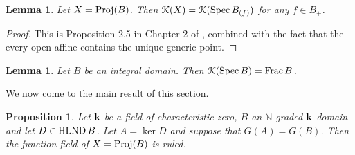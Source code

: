 \documentclass[12pt]{amsart}
\theoremstyle{plain}
\newtheorem{proposition}[subsection]{Proposition}
\newtheorem{lemma}[subsection]{Lemma}
\theoremstyle{definition}
\newcommand{\Spec}{		\operatorname{{\rm Spec}}}
\newcommand{\Proj}{		\operatorname{{\rm Proj}}}
\newcommand{\Frac}{		\operatorname{{\rm Frac}}}
\newcommand{\Nat}{\ensuremath{\mathbb{N}}}
\newcommand{\bk}{{\ensuremath{\rm \bf k}}}
\newcommand{\Keul}{\EuScript{K}}
\newcommand{\hlnd}{\operatorname{{\rm HLND}}}
\begin{document}
\begin{lemma}\label{ffIrrelevant} Let $X = \Proj(B)$. Then $\Keul(X) = \Keul(\Spec B_{(f)})$ for any $f \in B_+$. 
\end{lemma}
\begin{proof}
	This is Proposition 2.5 in Chapter 2 of \cite{Hartshorne}, combined with the fact that the every open affine contains the unique generic point. 
\end{proof}

\begin{lemma}\label{functionFraction} Let $B$ be an integral domain. Then $\Keul(\Spec B) = \Frac B$. 
\end{lemma}

We now come to the main result of this section. 

\begin{proposition} \label{mainResult} Let $\bk$ be a field of characteristic zero, $B$ an $\Nat$-graded $\bk$-domain and let $D \in \hlnd B$. Let $A = \ker D$ and suppose that $G(A) = G(B)$. Then the function field of $X = \Proj(B)$ is ruled.
\end{proposition}
\end{document}
